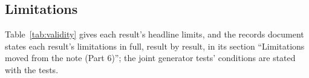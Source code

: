 \subsection{Limitations}
\label{sec:limitations}

\label{sec:execsummary-limitations}Table~\ref{tab:validity} gives each result's headline limits, and the records document states each result's limitations in full, result by result, in its section ``Limitations moved from the note (Part 6)''; the joint generator tests' conditions are stated with the tests.


